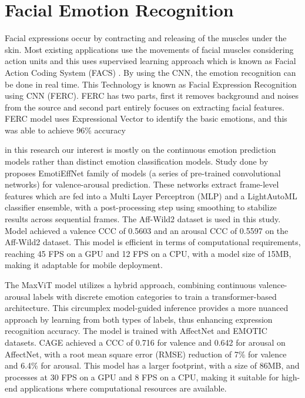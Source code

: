 \section{Facial Emotion Recognition}
\label{sec:fer}
\par Facial expressions occur by contracting and releasing of the muscles under the skin. Most existing applications use the movements of facial muscles considering action units and this uses supervised learning approach which is known as Facial Action Coding System (FACS) \citep{kantharia2015facial}. By using the CNN, the emotion recognition can be done in real time. This Technology is known as Facial Expression Recognition using CNN (FERC). FERC has two parts, first it removes background and noises from the source and second part entirely focuses on extracting facial features. FERC model uses Expressional Vector to identify the basic emotions, and this was able to achieve 96\% accuracy \citep{mehendale2020facial}

\par in this research our interest is mostly on the continuous emotion prediction models rather than distinct emotion classification models. Study done by \cite{savchenko2024hsemotion} proposes EmotiEffNet family of models (a series of pre-trained convolutional networks) for valence-arousal prediction. These networks extract frame-level features which are fed into a Multi Layer Perceptron (MLP) and a LightAutoML classifier ensemble, with a post-processing step using smoothing to stabilize results across sequential frames. The Aff-Wild2 \citep{kollias2018aff} dataset is used in this study. Model achieved a valence CCC of 0.5603 and an arousal CCC of 0.5597 on the Aff-Wild2 dataset. This model is efficient in terms of computational requirements, reaching 45 FPS on a GPU and 12 FPS on a CPU, with a model size of 15MB, making it adaptable for mobile deployment.

\par The MaxViT model \citep{wagner2024cage} utilizes a hybrid approach, combining continuous valence-arousal labels with discrete emotion categories to train a transformer-based architecture. This circumplex model-guided inference provides a more nuanced approach by learning from both types of labels, thus enhancing expression recognition accuracy. The model is trained with AffectNet \citep{mollahosseini2017affectnet} and EMOTIC \citep{kosti2019context} datasets. CAGE achieved a CCC of 0.716 for valence and 0.642 for arousal on AffectNet, with a root mean square error (RMSE) reduction of 7\% for valence and 6.4\% for arousal. This model has a larger footprint, with a size of 86MB, and processes at 30 FPS on a GPU and 8 FPS on a CPU, making it suitable for high-end applications where computational resources are available.

